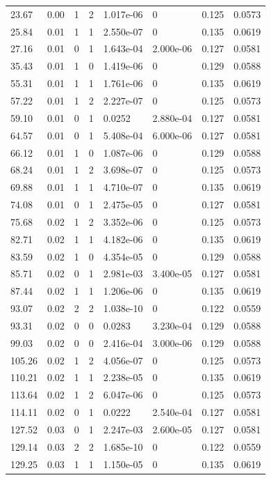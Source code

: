 \documentclass[preview]{standalone}
\begin{document}
{{\begin{tabular}{L{1.2cm}C{1.2cm} C{0.3cm}C{0.5cm} C{1.4cm}C{1.4cm} C{1.4cm}C{1.4cm}}
  23.67  &  0.00  & 1     &  2 &  1.017e-06  & 0  & 0.125 &  0.0573   \\ 
  25.84  &  0.01  & 1     &  1 &  2.550e-07  & 0  & 0.135 &  0.0619   \\ 
  27.16  &  0.01  & 0     &  1 &  1.643e-04  & 2.000e-06  & 0.127 &  0.0581   \\ 
  35.43  &  0.01  & 1     &  0 &  1.419e-06  & 0  & 0.129 &  0.0588   \\ 
  55.31  &  0.01  & 1     &  1 &  1.761e-06  & 0  & 0.135 &  0.0619   \\ 
  57.22  &  0.01  & 1     &  2 &  2.227e-07  & 0  & 0.125 &  0.0573   \\ 
  59.10  &  0.01  & 0     &  1 &  0.0252  & 2.880e-04  & 0.127 &  0.0581   \\ 
  64.57  &  0.01  & 0     &  1 &  5.408e-04  & 6.000e-06  & 0.127 &  0.0581   \\ 
  66.12  &  0.01  & 1     &  0 &  1.087e-06  & 0  & 0.129 &  0.0588   \\ 
  68.24  &  0.01  & 1     &  2 &  3.698e-07  & 0  & 0.125 &  0.0573   \\ 
  69.88  &  0.01  & 1     &  1 &  4.710e-07  & 0  & 0.135 &  0.0619   \\ 
  74.08  &  0.01  & 0     &  1 &  2.475e-05  & 0  & 0.127 &  0.0581   \\ 
  75.68  &  0.02  & 1     &  2 &  3.352e-06  & 0  & 0.125 &  0.0573   \\ 
  82.71  &  0.02  & 1     &  1 &  4.182e-06  & 0  & 0.135 &  0.0619   \\ 
  83.59  &  0.02  & 1     &  0 &  4.354e-05  & 0  & 0.129 &  0.0588   \\ 
  85.71  &  0.02  & 0     &  1 &  2.981e-03  & 3.400e-05  & 0.127 &  0.0581   \\ 
  87.44  &  0.02  & 1     &  1 &  1.206e-06  & 0  & 0.135 &  0.0619   \\ 
  93.07  &  0.02  & 2     &  2 &  1.038e-10  & 0  & 0.122 &  0.0559   \\ 
  93.31  &  0.02  & 0     &  0 &  0.0283  & 3.230e-04  & 0.129 &  0.0588   \\ 
  99.03  &  0.02  & 0     &  0 &  2.416e-04  & 3.000e-06  & 0.129 &  0.0588   \\ 
  105.26  &  0.02  & 1     &  2 &  4.056e-07  & 0  & 0.125 &  0.0573   \\ 
  110.21  &  0.02  & 1     &  1 &  2.238e-05  & 0  & 0.135 &  0.0619   \\ 
  113.64  &  0.02  & 1     &  2 &  6.047e-06  & 0  & 0.125 &  0.0573   \\ 
  114.11  &  0.02  & 0     &  1 &  0.0222  & 2.540e-04  & 0.127 &  0.0581   \\ 
  127.52  &  0.03  & 0     &  1 &  2.247e-03  & 2.600e-05  & 0.127 &  0.0581   \\ 
  129.14  &  0.03  & 2     &  2 &  1.685e-10  & 0  & 0.122 &  0.0559   \\ 
  129.25  &  0.03  & 1     &  1 &  1.150e-05  & 0  & 0.135 &  0.0619   \\ 
\hline 
\end{tabular} 

}}
\end{document}
